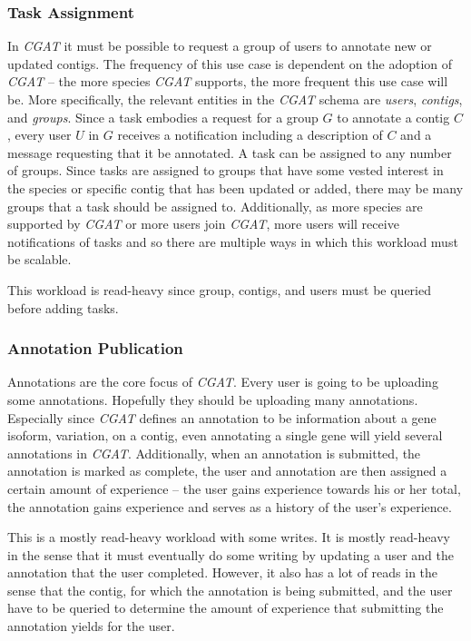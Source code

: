 \documentclass[12pt]{ucthesis}
\begin{document}
\subsubsection{Task Assignment}
In \textit{CGAT} it must be possible to request a group of users to annotate
new or updated contigs. The frequency of this use case is dependent on the
adoption of \textit{CGAT} -- the more species \textit{CGAT} supports, the more
frequent this use case will be. More specifically, the relevant entities in the
\textit{CGAT} schema are \textit{users}, \textit{contigs}, and \textit{groups}.
Since a task embodies a request for a group $G$ to annotate a contig $C$, every
user $U$ in $G$ receives a notification including a description of $C$ and a
message requesting that it be annotated. A task can be assigned to any number
of groups. Since tasks are assigned to groups that have some vested interest in
the species or specific contig that has been updated or added, there may be
many groups that a task should be assigned to. Additionally, as more species
are supported by \textit{CGAT} or more users join \textit{CGAT}, more users
will receive notifications of tasks and so there are multiple ways in which
this workload must be scalable.

This workload is read-heavy since group, contigs, and users must be queried before
adding tasks.

\subsubsection{Annotation Publication}
Annotations are the core focus of \textit{CGAT}. Every user is going to be
uploading some annotations. Hopefully they should be uploading many annotations. Especially
since \textit{CGAT} defines an annotation to be information about a gene
isoform, variation, on a contig, even annotating a single gene will yield several
annotations in \textit{CGAT}. Additionally, when an annotation is submitted,
the annotation is marked as complete, the user and annotation are then
assigned a certain amount of experience -- the user gains experience towards
his or her total, the annotation gains experience and serves as a history of the
user's experience.

This is a mostly read-heavy workload with some writes. It is mostly read-heavy in the
sense that it must eventually do some writing
by updating a user and the annotation that the user completed.
However, it also has a lot of reads in the sense that the contig, for which the
annotation is being submitted, and the user have to be queried to determine the amount of experience
that submitting the annotation yields for the user. 
\end{document}
